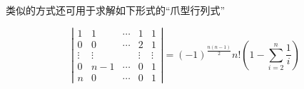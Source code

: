 \documentclass[10pt,a4paper%
tablecaptionabove]{article}
\newcommand{\cd}{\cdots}
\newcommand{\vd}{\vdots}
\begin{document}
\begin{CJK}{UTF8}{gkai}
类似的方式还可用于求解如下形式的“爪型行列式”

\begin{li}
  $$
  \left|
    \begin{array}{ccccc}
      1 & 1 & \cd & 1 & 1 \\
      0 & 0 & \cd & 2 & 1 \\
      \vd & \vd & & \vd & \vd \\
      0 & n-1 & \cd & 0 & 1 \\
      n & 0 & \cd & 0 & 1
    \end{array}
  \right|  = (-1)^{\frac{n(n-1)}2} n! \left(1-\sum_{i=2}^n\frac1i\right)
  $$
\end{li}


\end{CJK}
\end{document}
